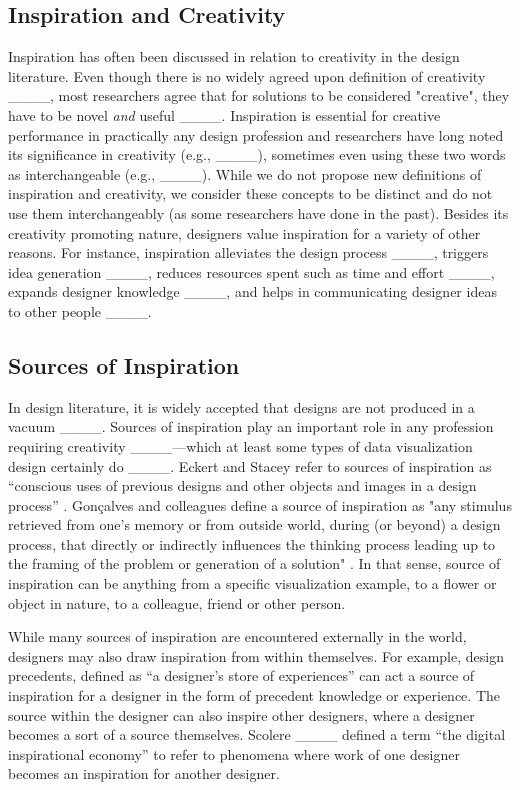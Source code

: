 \subsection{Inspiration and Creativity}
Inspiration has often been discussed in relation to creativity in the design literature. Even though there is no widely agreed upon definition of creativity ____, most researchers agree that for solutions to be considered "creative", they have to be novel \textit{and} useful ____. Inspiration is essential for creative performance in practically any design profession and researchers have long noted its significance in creativity (e.g., ____), sometimes even using these two words as interchangeable (e.g., ____). While we do not propose new definitions of inspiration and creativity, we consider these concepts to be distinct and do not use them interchangeably (as some researchers have done in the past). Besides its creativity promoting nature, designers value inspiration for a variety of other reasons. For instance, inspiration alleviates the design process ____, triggers idea generation ____, reduces resources spent such as time and effort ____, expands designer knowledge ____, and helps in communicating designer ideas to other people ____. 

\subsection{Sources of Inspiration}
In design literature, it is widely accepted that designs are not produced in a vacuum ____. Sources of inspiration play an important role in any profession requiring creativity ____---which at least some types of data visualization design certainly do ____. Eckert and Stacey refer to sources of inspiration as ``conscious uses of previous designs and other objects and images in a design process'' \cite[p. 524]{eckert_sources_2000}. Gon\c{c}alves and colleagues define a source of inspiration as "any stimulus retrieved from one's memory or from outside world, during (or beyond) a design process, that directly or indirectly influences the thinking process leading up to the framing of the problem or generation of a solution" \cite[p. 3]{goncalves_inspiration_2016}. In that sense, source of inspiration can be anything from a specific visualization example, to a flower or object in nature, to a colleague, friend or other person. 

While many sources of inspiration are encountered externally in the world, designers may also draw inspiration from within themselves. For example, design precedents, defined as ``a designer's store of experiences'' \cite[p. 1]{boling_nature_2021} can act a source of inspiration for a designer in the form of precedent knowledge or experience. The source within the designer can also inspire other designers, where a designer becomes a sort of a source themselves. Scolere ____ defined a term ``the digital inspirational economy'' to refer to phenomena where work of one designer becomes an inspiration for another designer. 

